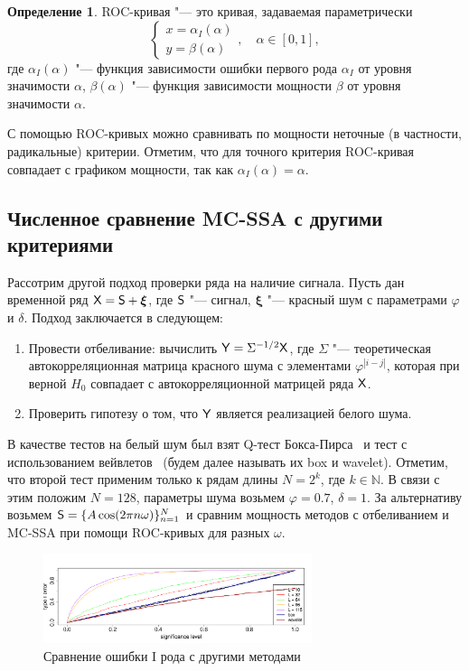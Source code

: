\documentclass[specialist,
substylefile = spbu_report.rtx,
subf,href,colorlinks=true, 12pt]{disser}
\theoremstyle{definition}
\newtheorem{definition}{Определение}
\newcommand{\bfxi}{\boldsymbol{\xi}}
\begin{document}
\begin{definition}
	ROC-кривая "--- это кривая, задаваемая параметрически
	\[
		\begin{cases}
			x=\alpha_I(\alpha) \\
			y=\beta(\alpha)
		\end{cases},\quad \alpha\in[0,1],
	\]
	где $\alpha_I(\alpha)$ "--- функция зависимости ошибки первого рода $\alpha_I$ от уровня значимости $\alpha$, $\beta(\alpha)$ "--- функция зависимости мощности $\beta$ от уровня значимости $\alpha$.
\end{definition}
С помощью ROC-кривых можно сравнивать по мощности неточные (в частности, радикальные) критерии. Отметим, что для точного критерия ROC-кривая совпадает с графиком мощности, так как $\alpha_I(\alpha)=\alpha$.

\subsection{Численное сравнение MC-SSA с другими критериями}\label{sect:mc-ssa_comparison}
Рассотрим другой подход проверки ряда на наличие сигнала. Пусть дан временной ряд $\tX=\tS+\bfxi$, где $\mathsf{S}$ "--- сигнал, $\bfxi$ "--- красный шум с параметрами $\varphi$ и $\delta$. Подход заключается в следующем:
\begin{enumerate}
	\item Провести отбеливание: вычислить $\mathsf{Y}=\Sigma^{-1/2}\mathsf{X}$, где $\Sigma$ "--- теоретическая автокорреляционная матрица красного шума с элементами $\varphi^{|i-j|}$, которая при верной $H_0$ совпадает с автокорреляционной матрицей ряда $\mathsf{X}$.
	\item Проверить гипотезу о том, что $\mathsf{Y}$ является реализацией белого шума.
\end{enumerate} 
В качестве тестов на белый шум был взят Q-тест Бокса-Пирса~\cite{box-pierce} и тест с использованием вейвлетов~\cite{wavelet} (будем далее называть их box и wavelet). Отметим, что второй тест применим только к рядам длины $N=2^k$, где $k\in\mathbb{N}$. В связи с этим положим $N=128$, параметры шума возьмем $\varphi=0.7$, $\delta=1$. За альтернативу возьмем $\mathsf{S}=\{A\cos(2\pi n\omega)\}_{n=1}^N$ и сравним мощность методов с отбеливанием и MC-SSA при помощи ROC-кривых для разных $\omega$.

\begin{figure}[h!]
	\centering
	\includegraphics[width=0.7\textwidth]{img/alphaI_testAR.pdf}
	\caption{Сравнение ошибки I рода с другими методами}
	\label{alphaI_testAR}
\end{figure}
\end{document}

